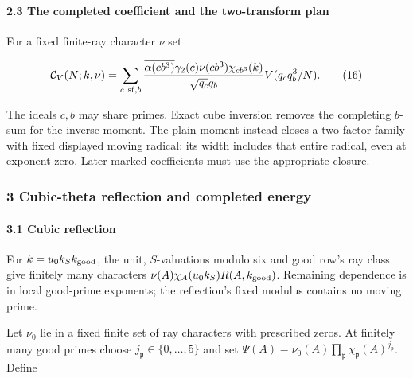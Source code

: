 \hypertarget{cf:completed-plan}{}

\label{cf:completed-plan}

\hypertarget{the-completed-coefficient-and-the-two-transform-plan}{%
\paragraph{2.3 The completed coefficient and the two-transform plan}\label{the-completed-coefficient-and-the-two-transform-plan}}

For a fixed finite-ray character \(\nu\) set

\hypertarget{cf:completed-definition}{}

\label{cf:completed-definition}

\[
\mathcal C_V(N;k,\nu)=\sum_{c\ {\rm sf},b}
\frac{\overline{\alpha(cb^3)}\gamma_2(c)\nu(cb^3)\chi_{cb^3}(k)}{\sqrt{q_c}q_b}
V(q_cq_b^3/N).
\qquad\text{(16)}
\]

The ideals \(c,b\) may share primes. Exact cube inversion removes the completing \(b\)-sum for the inverse moment. The plain moment instead closes a two-factor family with fixed displayed moving radical: its width includes that entire radical, even at exponent zero. Later marked coefficients must use the appropriate closure.

\hypertarget{cf:sec:B}{}

\label{cf:sec:B}

\hypertarget{cubic-theta-reflection-and-completed-energy}{%
\subsubsection{3 Cubic-theta reflection and completed energy}\label{cubic-theta-reflection-and-completed-energy}}

\hypertarget{cf:sec:B.1}{}

\label{cf:sec:B.1}

\hypertarget{cubic-reflection}{%
\paragraph{3.1 Cubic reflection}\label{cubic-reflection}}

For \(k=u_0k_Sk_{\rm good}\), the unit, \(S\)-valuations modulo six and good row's ray class give finitely many characters \(\nu(A)\chi_A(u_0k_S)R(A,k_{\rm good})\). Remaining dependence is in local good-prime exponents; the reflection's fixed modulus contains no moving prime.

Let \(\nu_0\) lie in a fixed finite set of ray characters with prescribed zeros. At finitely many good primes choose \(j_{\mathfrak p}\in\{0,\ldots,5\}\) and set \(\Psi(A)=\nu_0(A)\prod_{\mathfrak p}\chi_{\mathfrak p}(A)^{j_{\mathfrak p}}\). Define

